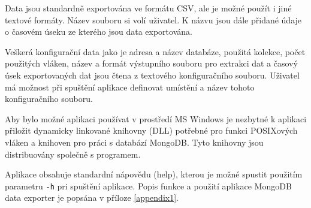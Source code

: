 Data jsou standardně exportována ve formátu CSV, ale je možné použít i jiné textové formáty. Název souboru si volí uživatel. K názvu jsou dále přidané údaje o časovém úseku ze kterého jsou data exportována.

Veškerá konfigurační data jako je adresa a název databáze, použitá kolekce, počet použitých vláken, název a formát výstupního souboru pro extrakci dat a časový úsek exportovaných dat jsou čtena z textového konfiguračního souboru. Uživatel má možnost při spuštění aplikace definovat umístění a název tohoto konfiguračního souboru. 

Aby bylo možné aplikaci používat v prostředí MS Windows je nezbytné k aplikaci přiložit dynamicky linkované knihovny (DLL) potřebné pro funkci POSIXových vláken a knihoven pro práci s databází MongoDB. Tyto knihovny jsou distribuovány společně s programem.

Aplikace obsahuje standardní nápovědu (help), kterou je možné spustit použitím parametru \texttt{-h} pri spuštění aplikace. Popis funkce a použití aplikace MongoDB data exporter je popsána v příloze \ref{appendix1}.